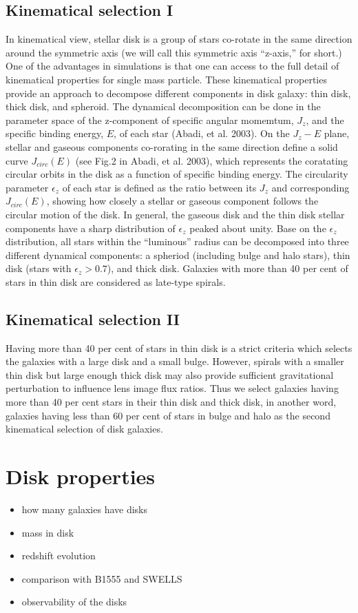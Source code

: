 \documentclass[useAMS,usenatbib]{mn2e}
\begin{document}
\subsection{Kinematical selection I}
In kinematical view, stellar disk is a group of stars co-rotate in the same direction around the  symmetric axis (we will call this symmetric axis ``z-axis,'' for short.) One of the advantages in simulations is that one can access to the full detail of kinematical properties for single mass particle. These kinematical properties provide an approach to decompose different components in disk galaxy: thin disk, thick disk, and spheroid. The dynamical decomposition can be done in the parameter space of the z-component of specific angular momemtum, $J_z$, and the specific binding energy, $E$, of each star (Abadi, et al. 2003). On the $J_z - E$ plane, stellar and gaseous components co-rorating in the same direction define a solid curve $J_{circ}(E)$ (see Fig.2 in Abadi, et al. 2003), which represents the coratating circular orbits in the disk as a function of specific binding energy. The circularity parameter $\epsilon_z$ of each star is defined as the ratio between its  $J_z$ and corresponding $J_{circ}(E)$, showing how closely a stellar or gaseous component follows the circular motion of the disk. In general, the gaseous disk and the thin disk stellar components have a sharp distribution of $\epsilon_z$ peaked about unity. Base on the $\epsilon_z$ distribution, all stars within the ``luminous'' radius can be decomposed into three different dynamical components: a spheriod (including bulge and halo stars), thin disk (stars with $\epsilon_z > 0.7$), and thick disk. Galaxies with more than 40 per cent of stars in thin disk are considered as late-type spirals.

\subsection{Kinematical selection II}
Having more than 40 per cent of stars in thin disk is a strict criteria which selects the galaxies with a large disk and a small bulge. However, spirals with a smaller thin disk but large enough thick disk may also provide sufficient gravitational perturbation to influence lens image flux ratios. Thus we select galaxies having more than 40 per cent stars in their thin disk and thick disk, in another word, galaxies having less than 60 per cent of stars in bulge and halo as the second kinematical selection of disk galaxies.

\section{Disk properties}
\begin{itemize}
\item how many galaxies have disks
\item mass in disk
\item redshift evolution
\item comparison with B1555 and SWELLS
\item observability of the disks
\end{itemize}
\end{document}
